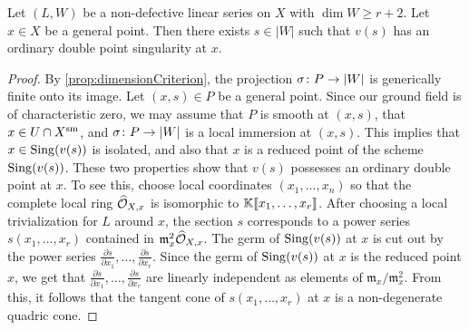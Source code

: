 \begin{proposition}\label{prop:ordinarydoublepoint}
  Let $(L, W)$ be a non-defective linear series on $X$ with $\dim W \geq r+2$.
  Let $x \in X$ be a general point.
  Then there exists $s \in |W|$ such that $v(s)$ has an ordinary double point singularity at $x$.
\end{proposition}
\begin{proof}
  By \autoref{prop:dimensionCriterion}, the projection $\sigma{\colon} P \to |W|$ is generically finite onto its image. 
  Let $(x,s) \in P$ be a general point.
  Since our ground field is of characteristic zero, we may assume that $P$ is smooth at $(x,s)$, that $x \in U \cap X^{\rm sm}$, and $\sigma {\colon} P \to |W|$ is a local immersion at $(x,s)$.
  This implies that $x \in \operatorname{Sing}(v(s))$ is isolated, and also that $x$ is a reduced point of the scheme $\operatorname{Sing}(v(s))$.
  These two properties show that $v(s)$ possesses an ordinary double point at $x$.
  To see this, choose local coordinates $(x_{1}, ..., x_{n})$ so that the complete local ring ${\widehat{\mathcal O}_{X,x}}$ is isomorphic to $\mathbb{K}\llbracket x_{1},\dots, x_{r}\rrbracket$.
  After choosing a local trivialization for $L$ around $x$, the section $s$ corresponds to a power series $s(x_1,\dots,x_r)$ contained in $\mathfrak m_x^2 \widehat {\mathcal O}_{X,x}$.
  The germ of $\operatorname{Sing}(v(s))$ at $x$ is cut out by the power series $\frac{\partial s}{\partial x_1}, \dots, \frac{\partial s}{\partial x_r}$.
  Since the germ of $\operatorname{Sing}(v(s))$ at $x$ is the reduced point $x$, we get that $\frac{\partial s}{\partial x_1}, \dots, \frac{\partial s}{\partial x_r}$ are linearly independent as elements of $\mathfrak m_x / \mathfrak m_x^2$.
  From this, it follows that the tangent cone of $s(x_1, \dots, x_r)$ at $x$ is a non-degenerate quadric cone.
\end{proof}


